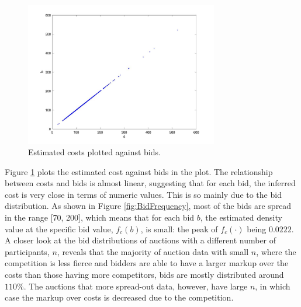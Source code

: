 \documentclass[11pt]{article}
\begin{document}
\begin{figure}[h]
    \includegraphics[width=0.75\textwidth]{cost_bid.jpg}
    \centering
    \caption{Estimated costs plotted against bids.}
   
    \label{fig:cost_bid}
\end{figure}

Figure \ref{fig:cost_bid} plots the estimated cost against bids in the plot. 
The relationship between costs and bids is almost linear, suggesting that for 
each bid, the inferred cost is very close in terms of numeric values. This is so 
mainly due to the bid distribution. As shown in Figure \ref{fig:BidFrequency}, 
most of the bids are spread in the range [70, 200], which means that for each 
bid $b$, the estimated density value at the specific bid value, $f_c(b)$, is 
small: the peak of $f_c(\cdot)$ being $0.0222$. A closer look at the bid 
distributions of auctions with a different number of participants, $n$, reveals 
that the majority of auction data with small $n$, where the competition is less 
fierce and bidders are able to have a larger markup over the costs than those 
having more competitors, bids are mostly distributed around $110\%$. The 
auctions that more spread-out data, however, have large $n$, in which case 
the markup over costs is decreased due to the competition.  
\end{document}
